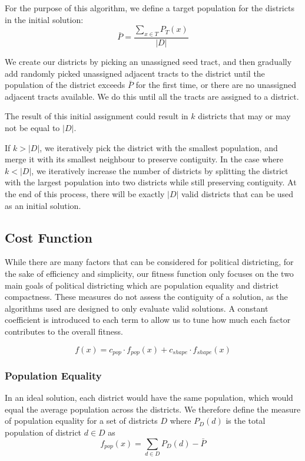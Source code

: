\documentclass[journal]{IEEEtran}
\begin{document}
For the purpose of this algorithm, we define a target population for the
districts in the initial solution:
$$\bar{P} = \frac{\sum_{x \in T} P_T(x)}{|D|}$$

We create our districts by picking an unassigned seed tract, and then gradually
add randomly picked unassigned adjacent tracts to the district until the
population of the district exceeds $\bar{P}$ for the first time, or there are no
unassigned adjacent tracts available. We do this until all the tracts are
assigned to a district.

The result of this initial assignment could result in $k$ districts that may or
may not be equal to $|D|$.

If $k > |D|$, we iteratively pick the district with the smallest population, and
merge it with its smallest neighbour to preserve contiguity. In the case where
$k < |D|$, we iteratively increase the number of districts by splitting the
district with the largest population into two districts while still preserving
contiguity. At the end of this process, there will be exactly $|D|$ valid
districts that can be used as an initial solution.

\subsection{Cost Function}
While there are many factors that can be considered for political districting,
for the sake of efficiency and simplicity, our fitness function only focuses on
the two main goals of political districting which are population equality and
district compactness.  These measures do not assess the contiguity of a
solution, as the algorithms used are designed to only evaluate valid solutions.
A constant coefficient is introduced to each term to allow us to tune how much
each factor contributes to the overall fitness.

$$f(x) = c_{pop} \cdot f_{pop}(x) + c_{shape} \cdot f_{shape}(x)$$

\subsubsection{Population Equality}
In an ideal solution, each district would have the same population, which would
equal the average population across the districts.  We therefore define the
measure of population equality for a set of districts $D$ where $P_D(d)$ is the
total population of district $d \in D$ as
$$f_{pop}(x) = \sum_{d \in D} P_D(d) - \bar{P}$$
\end{document}
